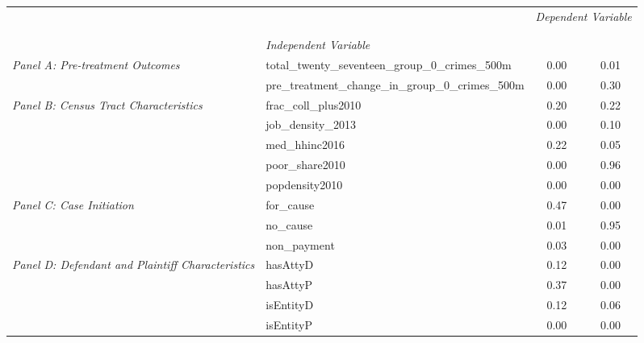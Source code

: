 \begin{tabular}{llcc}
\toprule
 &  & \multicolumn{2}{c}{\textit{Dependent Variable}} \\
\cline{3-4}
\\
 &  &  &  \\
 & \emph{Independent Variable} &  &  \\
\midrule
\multirow[c]{2}{3cm}{\textit{Panel A: Pre-treatment Outcomes}} & total_twenty_seventeen_group_0_crimes_500m & 0.00 & 0.01 \\
 & pre_treatment_change_in_group_0_crimes_500m & 0.00 & 0.30 \\
\cline{1-4}
\multirow[c]{5}{3cm}{\textit{Panel B: Census Tract Characteristics}} & frac_coll_plus2010 & 0.20 & 0.22 \\
 & job_density_2013 & 0.00 & 0.10 \\
 & med_hhinc2016 & 0.22 & 0.05 \\
 & poor_share2010 & 0.00 & 0.96 \\
 & popdensity2010 & 0.00 & 0.00 \\
\cline{1-4}
\multirow[c]{3}{3cm}{\textit{Panel C: Case Initiation}} & for_cause & 0.47 & 0.00 \\
 & no_cause & 0.01 & 0.95 \\
 & non_payment & 0.03 & 0.00 \\
\cline{1-4}
\multirow[c]{4}{3cm}{\textit{Panel D: Defendant and Plaintiff Characteristics}} & hasAttyD & 0.12 & 0.00 \\
 & hasAttyP & 0.37 & 0.00 \\
 & isEntityD & 0.12 & 0.06 \\
 & isEntityP & 0.00 & 0.00 \\
\cline{1-4}
\bottomrule
\end{tabular}
